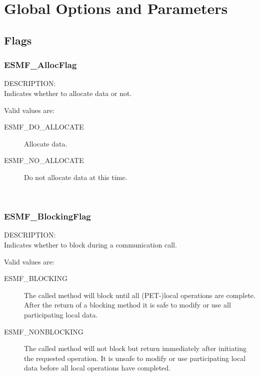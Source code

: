 
\section{Global Options and Parameters}

\subsection{Flags}

\subsubsection{ESMF\_AllocFlag}

{\sf DESCRIPTION:\\}  
Indicates whether to allocate data or not.

Valid values are:
\begin{description}
\item [ESMF\_DO\_ALLOCATE]
      Allocate data. 
\item [ESMF\_NO\_ALLOCATE]
      Do not allocate data at this time. 
\end{description}

\mbox{}\hrulefill\

\subsubsection{ESMF\_BlockingFlag}

{\sf DESCRIPTION:\\}  
Indicates whether to block during a communication call.

Valid values are:
\begin{description}

\item [ESMF\_BLOCKING]
         The called method will block until all (PET-)local operations are 
         complete. After the return of a blocking method it is safe to modify
         or use all participating local data.
\item [ESMF\_NONBLOCKING]
         The called method will not block but return immediately after
         initiating the requested operation. It is unsafe to modify
         or use participating local data before all local operations have     
         completed.

\end{description}


